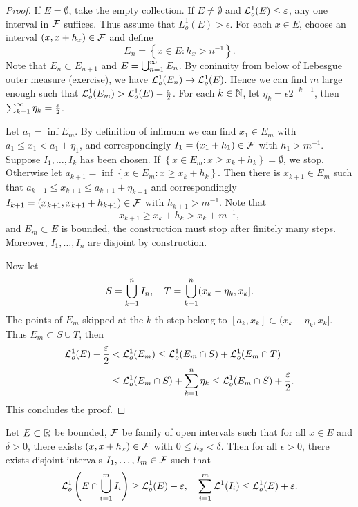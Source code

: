\documentclass[a4paper]{article}
\begin{document}
\begin{proof}
  If $E = \emptyset$, take the empty collection. If $E \neq \emptyset$ and
  $\mathcal{L}_o^1 (E) \leq \varepsilon$, any one interval in $\mathcal{F}$ suffices. Thus
  assume that $L_o^1 (E) > \epsilon$. For each $x \in E$, choose an
  interval $(x, x + h_x) \in \mathcal{F}$ and define
  \[
    E_n = \left\{ x \in E : h_x > n^{-1} \right\}.
  \]
  Note that $E_n \subset E_{n + 1}$ and $E = \bigcup_{n=1}^\infty E_n$. By coninuity
  from below of Lebesgue outer measure (exercise), we have $\mathcal{L}_o^1 (E_n)
  \to \mathcal{L}_o^1 (E)$. Hence we can find $m$ large enough such that $\mathcal{L}_o^1
  (E_m) > \mathcal{L}_o^1 (E) - \frac{\varepsilon}{2}$. For each $k \in \mathbb{N}$, let
  $\eta_k = \epsilon 2^{- k - 1}$, then $\sum_{k=1}^\infty \eta_k =
  \frac{\varepsilon}{2}$.

  Let $a_1 = \inf E_m$. By definition of infimum we can find $x_1 \in E_m$
  with $a_1 \leq x_1 < a_1 + \eta_1$, and correspondingly $I_1 = (x_1 +
  h_1) \in \mathcal{F}$ with $h_1 > m^{-1}$. Suppose $I_1, \dots, I_k$ has been
  chosen. If $\left\{ x \in E_m : x \geq x_k + h_k \right\} = \emptyset$,
  we stop. Otherwise let $a_{k + 1} = \inf \left\{ x \in E_m : x \geq x_k
  + h_k \right\}$. Then there is $x_{k + 1} \in E_m$ such that $a_{k + 1}
  \leq x_{k + 1} \leq a_{k + 1} + \eta_{k + 1}$ and correspondingly $I_{k
  + 1} = (x_{k + 1}, x_{k + 1} + h_{k + 1}) \in \mathcal{F}$ with $h_{k + 1} >
  m^{-1}$. Note that
  \[
    x_{k + 1} \geq x_k + h_k > x_k + m^{-1} ,
  \]
  and $E_m \subset E$ is bounded, the construction must stop after
  finitely many steps. Moreover, $I_1, \dots, I_n$ are disjoint by
  construction.

  Now let
  \[
    S = \bigcup_{k=1}^n I_n, \quad T = \bigcup_{k=1}^n (x_k - \eta_k, x_k].
  \]
  The points of $E_m$ skipped at the $k$-th step belong to $[a_k, x_k]
  \subset (x_k - \eta_k, x_k]$. Thus $E_m \subset S \cup T$, then
  \begin{align*}
    \mathcal{L}_o^1 (E) - \frac{\varepsilon}{2}
     & < \mathcal{L}_o^1 (E_m) \leq \mathcal{L}_o^1 (E_m \cap S) + \mathcal{L}_o^1 (E_m \cap T) \\
     & \leq \mathcal{L}_o^1 (E_m \cap S) + \sum_{k=1}^n \eta_k
    \leq \mathcal{L}_o^1 (E_m \cap S) + \frac{\varepsilon}{2}.
  \end{align*}
  This concludes the proof.
\end{proof}

\begin{lemma}
  Let $E \subset \mathbb{R}$ be bounded, $\mathcal{F}$ be family of open intervals such
  that for all $x \in E$ and $\delta > 0$, there exists $(x, x + h_x) \in
    \mathcal{F}$ with $0 \leq h_x < \delta$. Then for all $\epsilon > 0$, there
  exists disjoint intervals $I_1, \dots, I_m \in \mathcal{F}$ such that
  \[
    \mathcal{L}_o^1 \left( E \cap \bigcup_{i=1}^m I_i \right) \geq \mathcal{L}_o^1(E) - \varepsilon,
    \quad
    \sum_{i=1}^m \mathcal{L}^1 (I_i) \leq \mathcal{L}_o^1 (E) + \varepsilon.
  \]
\end{lemma}
\end{document}
